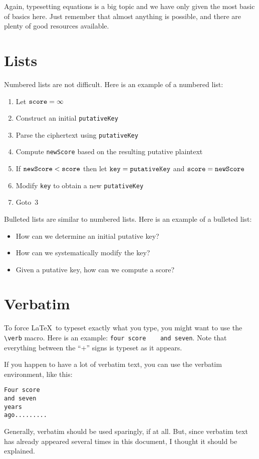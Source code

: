 Again, typesetting equations is a big topic and we have only given the most basic
of basics here. Just remember that almost anything is possible, and there
are plenty of good resources available. 


\section{Lists}

Numbered lists are not difficult. Here is an example
of a numbered list:
\begin{enumerate}
\item Let $\mbox{\tt score} = \infty$
\item Construct an initial {\tt putativeKey} 
\item Parse the ciphertext using {\tt putativeKey}
\item Compute {\tt newScore} based on the resulting putative plaintext
\item If $\mbox{\tt newScore} < \mbox{\tt score}$ then 
let $\mbox{\tt key} = \mbox{\tt putativeKey}$ and $\mbox{\tt score} = \mbox{\tt newScore}$
\item Modify {\tt key} to obtain a new {\tt putativeKey}
\item Goto~3
\end{enumerate}

Bulleted lists are similar to numbered lists. Here is an example of a bulleted list:
\begin{itemize}
\item How can we determine an initial putative key?
\item  How can we systematically modify the key?
\item Given a putative key, how can we compute a score?
\end{itemize}


\section{Verbatim}

To force \LaTeX\ to typeset exactly what you type, you might want to use the \verb+\verb+
macro. Here is an example:
\verb+four score    and seven+. Note that everything between the ``+'' signs
is typeset as it appears. 

If you happen to have a lot of verbatim text, you can use the verbatim environment,
like this:

\begin{verbatim}
Four score
and seven
years
ago.........
\end{verbatim}

Generally, verbatim should be used sparingly, if at all. But, since
verbatim text has already appeared several times in this document, I thought it
should be explained.

\fi